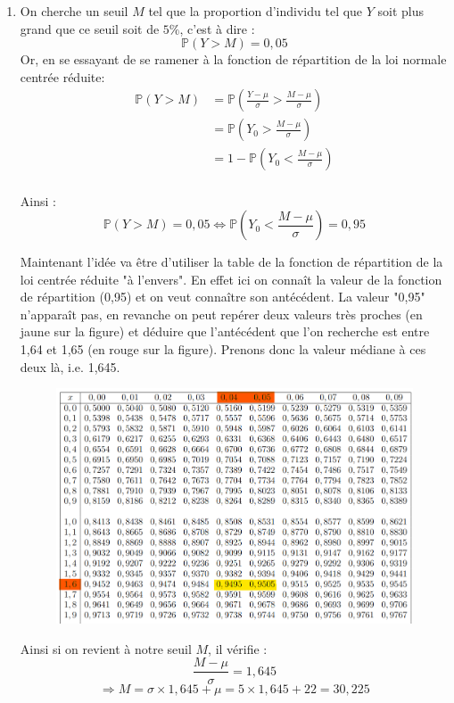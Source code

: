 \documentclass[a4paper,oneside,12pt]{article}
\theoremstyle{plain}
\def\P{{\mathbb P}}
\begin{document}
\begin{enumerate}
    \item On cherche un seuil $M$ tel que la proportion d'individu tel que $Y$ soit plus grand que ce seuil soit de $5\%$, c'est à dire :
    $$\P(Y> M) = 0,05$$
    Or, en se essayant de se ramener à la fonction de répartition de la loi normale centrée réduite:
    \begin{align*}
        \P(Y>M) &= \P\left(\frac{Y-\mu}{\sigma}>\frac{M-\mu}{\sigma}\right)\\
        &=\P\left(Y_0>\frac{M-\mu}{\sigma}\right)\\
        &=1-\P\left(Y_0<\frac{M-\mu}{\sigma}\right)\\
    \end{align*}
    
    Ainsi :
    $$ \P(Y> M) = 0,05 \Leftrightarrow \P\left(Y_0<\frac{M-\mu}{\sigma}\right) = 0,95$$
    
    Maintenant l'idée va être d'utiliser la table de la fonction de répartition de la loi centrée réduite "à l'envers". En effet ici on connaît la valeur de la fonction de répartition (0,95) et on veut connaître son antécédent. La valeur "0,95" n'apparaît pas, en revanche on peut repérer deux valeurs très proches (en jaune sur la figure) et déduire que l'antécédent que l'on recherche est entre 1,64 et 1,65 (en rouge sur la figure). Prenons donc la valeur médiane à ces deux là, i.e. 1,645. 
            \begin{figure}[h]
    \centering
    \includegraphics[width = \textwidth]{images/table_1.png}
\end{figure}

Ainsi si on revient à notre seuil $M$, il vérifie :
    $$\frac{M-\mu}{\sigma} = 1,645$$
    $$\Rightarrow M = \sigma \times 1,645 + \mu = 5 \times 1,645 + 22 = 30, 225$$
    

\end{enumerate}
\end{document}
